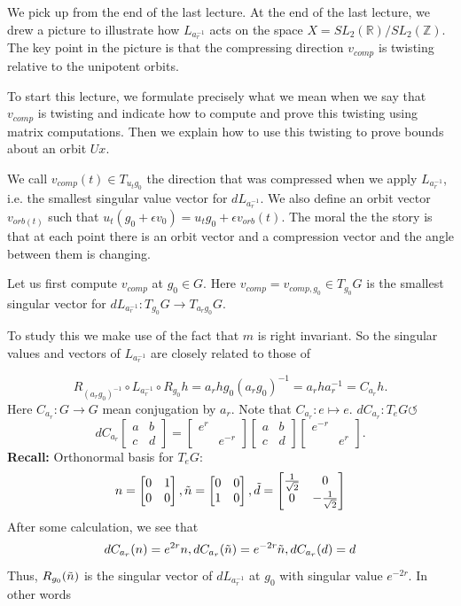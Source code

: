 \documentclass[12pt]{amsart}
\newcommand{\ZZ}{\mathbb{Z}}
\newcommand{\RR}{\mathbb{R}}
\begin{document}
We pick up from the end of the last lecture.  At the end of the last lecture, we drew a picture to illustrate how $L_{a_r^{-1}}$ acts on the space $X = SL_2(\RR) / SL_2(\ZZ)$.  The key point in the picture is that the compressing direction $v_{comp}$ is twisting relative to the unipotent orbits.

To start this lecture, we formulate precisely what we mean when we say that $v_{comp}$ is twisting and indicate how to compute and prove this twisting using matrix computations.  Then we explain how to use this twisting to prove bounds about an orbit $U x$.

We call $v_{comp}(t)\in T_{u_tg_0}$ the direction that was compressed when we apply $L_{a_r^{-1}}$, i.e. the smallest singular value vector for $dL_{a_r^{-1}}$. We also define an orbit vector $v_{orb(t)}$ such that $u_t(g_0+\epsilon v_0)=u_tg_0+\epsilon v_{orb}(t)$. The moral the the story is that at each point there is an orbit vector and a compression vector and the angle between them is changing. 

Let us first compute $v_{comp}$ at $g_0 \in G$.   Here $v_{comp} = v_{comp, g_0} \in T_{g_0} G$ is the smallest singular vector for $d L_{a_r^{-1}}: T_{g_0} G \rightarrow T_{a_r g_0} G$.  

To study this we make use of the fact that $m$ is right invariant.   So the singular values and vectors of $L_{a_r^{-1}}$ are closely related to those of

$$R_{(a_rg_0)^{-1}}\circ L_{a_r^{-1}}\circ R_{g_0}h=a_rhg_0(a_rg_0)^{-1}=a_rha_r^{-1}=C_{a_r}h.$$
Here $C_{a_r}:G \rightarrow G$ mean conjugation by $a_r$. Note that $C_{a_r}: e \mapsto e$. 
$d C_{a_r}: T_e G \circlearrowleft $
$$d C_{a_r}\begin{bmatrix}
  a &b \\
c & d
\end{bmatrix}= \begin{bmatrix}
  e^r & \\
 & e^{-r}
\end{bmatrix}\begin{bmatrix}
  a &b \\
c & d
\end{bmatrix}\begin{bmatrix}
  e^{-r} & \\
 & e^r
\end{bmatrix}.$$
\textbf{Recall:} Orthonormal basis for $T_eG:$ 
$$n=\begin{bmatrix}
  0 &1 \\
   0 & 0
\end{bmatrix},\Tilde{n}=\begin{bmatrix}
  0 &0 \\
   1 & 0
\end{bmatrix},\Tilde{d}=\begin{bmatrix}
  \frac{1}{\sqrt{2}} &0 \\
   0 & -\frac{1}{\sqrt{2}}
\end{bmatrix} $$
After some calculation, we see that 
$$dC_{a_r}(n)=e^{2r}n, dC_{a_r}(\Tilde{n})=e^{-2r}\Tilde{n},dC_{a_r}(d)=d$$
Thus, $R_{g_0}(\Tilde{n})$ is the singular vector of $dL_{a_r^{-1}}$ at $g_0$ with singular value $e^{-2r}$.  In other words
\end{document}
